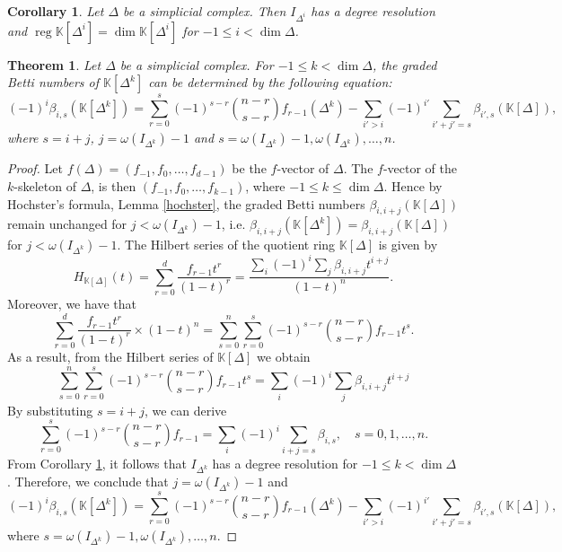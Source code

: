 \documentclass[10pt,a4paper]{amsart}
\newtheorem{corollary}{Corollary}
\newtheorem{theorem}{Theorem}
\newcommand{\K}[0]{\mathbb{K}}
\DeclareMathOperator{\reg}{reg}
\begin{document}
\begin{corollary}\label{skeleton degree resolution}
	Let $\Delta$ be a simplicial complex. Then $I_{\Delta^i}$ has a degree resolution and $\reg\K[\Delta^i]=\dim\K[\Delta^i]$ for $-1\le i<\dim\Delta$.
\end{corollary}

\begin{theorem}\label{Betti k-skeleton}
	Let $\Delta$ be a simplicial complex. For $-1\le k<\dim\Delta$, the graded Betti numbers of $\K[\Delta^k]$ can be determined by the following equation:
	$$(-1)^{i}\beta_{i,s}(\K[\Delta^k])=\sum_{r=0}^{s}(-1)^{s-r}\binom{n-r}{s-r}f_{r-1}(\Delta^k)-\sum_{i'>i}(-1)^{i'}\sum_{i'+j'=s}\beta_{i',s}(\K[\Delta]),$$
	where $s=i+j$, $j=\omega(I_{\Delta^k})-1$ and $s=\omega(I_{\Delta^k})-1,\omega(I_{\Delta^k}),\dots,n$.
\end{theorem}

\begin{proof}
	Let $f(\Delta)=(f_{-1},f_0,\dots,f_{d-1})$ be the $f$-vector of $\Delta$. The $f$-vector of the $k$-skeleton of $\Delta$, is then $(f_{-1},f_0,\dots,f_{k-1})$, where $-1\le k\le\dim\Delta$. Hence by Hochster’s formula, Lemma \ref{hochster}, the graded Betti numbers $\beta_{i,i+j}(\K[\Delta])$ remain unchanged for $j<\omega(I_{\Delta^k})-1$, i.e. $\beta_{i,i+j}(\K[\Delta^k])=\beta_{i,i+j}(\K[\Delta])$ for $j<\omega(I_{\Delta^k})-1$. The Hilbert series of the quotient ring $\K[\Delta]$ is given by
	$$H_{\K[\Delta]}(t)=\sum_{r=0}^{d} \frac{f_{r-1} t^{r}}{(1-t)^{r}}=\frac{\sum_i(-1)^i\sum_j\beta_{i,i+j}t^{i+j}}{(1-t)^n}.$$
	Moreover, we have that
	$$\displaystyle\sum_{r=0}^{d} \frac{f_{r-1} t^{r}}{(1-t)^{r}}\times(1-t)^n=\sum_{s=0}^{n}\sum_{r=0}^{s}(-1)^{s-r}\binom{n-r}{s-r}f_{r-1}t^s.$$
	As a result, from the Hilbert series of $\K[\Delta]$ we obtain
	$$\sum_{s=0}^{n}\sum_{r=0}^{s}(-1)^{s-r}\binom{n-r}{s-r}f_{r-1}t^s=\sum_{i}(-1)^i\sum_j\beta_{i,i+j}t^{i+j}$$
	By substituting $s=i+j$, we can derive
	$$\sum_{r=0}^{s}(-1)^{s-r}\binom{n-r}{s-r}f_{r-1}=\sum_{i}(-1)^i\sum_{i+j=s}\beta_{i,s},\quad s=0,1,\dots,n.$$
	From Corollary \ref{skeleton degree resolution}, it follows that $I_{\Delta^k}$ has a degree resolution for $-1\le k<\dim\Delta$. Therefore, we conclude that $j=\omega(I_{\Delta^k})-1$ and
	$$(-1)^{i}\beta_{i,s}(\K[\Delta^k])=\sum_{r=0}^{s}(-1)^{s-r}\binom{n-r}{s-r}f_{r-1}(\Delta^k)-\sum_{i'>i}(-1)^{i'}\sum_{i'+j'=s}\beta_{i',s}(\K[\Delta]),$$
	where $s=\omega(I_{\Delta^k})-1,\omega(I_{\Delta^k}),\dots,n$.
\end{proof}
\end{document}
